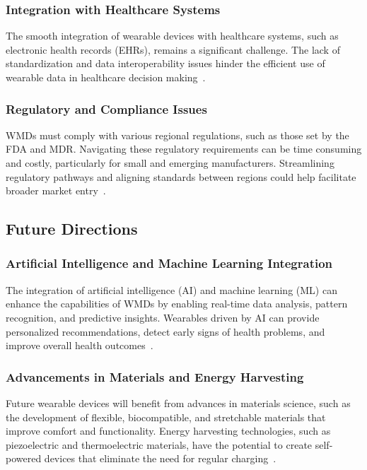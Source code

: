 \documentclass[journal]{IEEEtran}
\begin{document}
        \subsubsection{Integration with Healthcare Systems}

        The smooth integration of wearable devices with healthcare systems, such as electronic health records (EHRs), remains a significant challenge. The lack of standardization and data interoperability issues hinder the efficient use of wearable data in healthcare decision making~\cite{Ravizza2019, Cusack2024}.

        \subsubsection{Regulatory and Compliance Issues}

        WMDs must comply with various regional regulations, such as those set by the FDA and MDR. Navigating these regulatory requirements can be time consuming and costly, particularly for small and emerging manufacturers. Streamlining regulatory pathways and aligning standards between regions could help facilitate broader market entry~\cite{Ravizza2019, Babu2024}.

    \subsection{Future Directions}

        \subsubsection{Artificial Intelligence and Machine Learning Integration}

        The integration of artificial intelligence (AI) and machine learning (ML) can enhance the capabilities of WMDs by enabling real-time data analysis, pattern recognition, and predictive insights. Wearables driven by AI can provide personalized recommendations, detect early signs of health problems, and improve overall health outcomes~\cite{Nahavandi2022, Babu2024}.

        \subsubsection{Advancements in Materials and Energy Harvesting}

        Future wearable devices will benefit from advances in materials science, such as the development of flexible, biocompatible, and stretchable materials that improve comfort and functionality. Energy harvesting technologies, such as piezoelectric and thermoelectric materials, have the potential to create self-powered devices that eliminate the need for regular charging~\cite{Pantrangi2024}.
\end{document}
